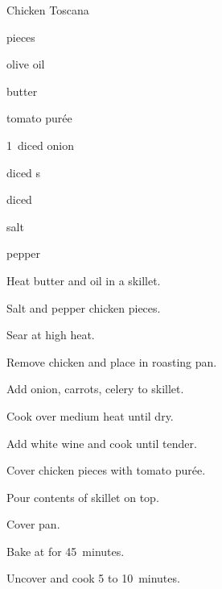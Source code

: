 \begin{recipe}{Chicken Toscana}{}{}

\begin{ingredients}
\item {} pieces
\item olive oil
\item butter
\item tomato pur\'ee
\item 1~diced onion
\item diced s
\item diced 
\item salt
\item pepper
\end{ingredients}

\begin{directions}
\item Heat butter and oil in a skillet.
\item Salt and pepper chicken pieces.
\item Sear at high heat.
\item Remove chicken and place in roasting pan.
\item Add onion, carrots, celery to skillet.
\item Cook over medium heat until dry.
\item Add white wine and cook until tender.
\item Cover chicken pieces with tomato pur\'ee.
\item Pour contents of skillet on top.
\item Cover pan.
\item Bake at  for 45~minutes.
\item Uncover and cook 5 to 10~minutes.
\end{directions}

\end{recipe}
